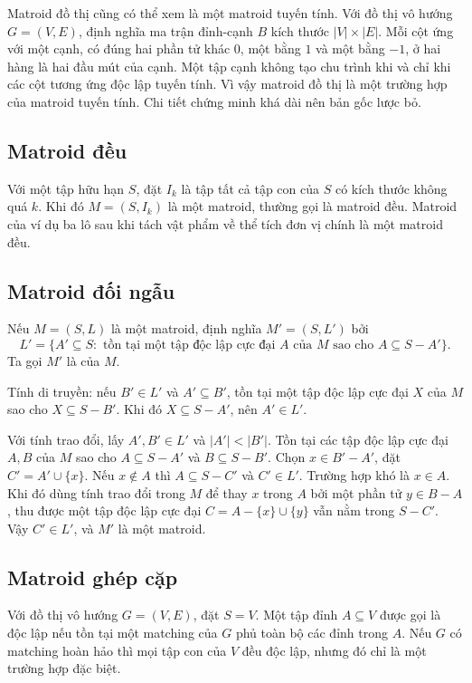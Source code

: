 \documentclass[11pt]{article}
\begin{document}
Matroid đồ thị cũng có thể xem là một matroid tuyến tính. Với đồ thị vô hướng
\(G=(V,E)\), định nghĩa ma trận đỉnh-cạnh \(B\) kích thước \(|V|\times |E|\).
Mỗi cột ứng với một cạnh, có đúng hai phần tử khác \(0\), một bằng \(1\) và
một bằng \(-1\), ở hai hàng là hai đầu mút của cạnh. Một tập cạnh không tạo
chu trình khi và chỉ khi các cột tương ứng độc lập tuyến tính. Vì vậy matroid
đồ thị là một trường hợp của matroid tuyến tính. Chi tiết chứng minh khá dài
nên bản gốc lược bỏ.

\subsection*{Matroid đều}

Với một tập hữu hạn \(S\), đặt \(I_k\) là tập tất cả tập con của \(S\) có kích
thước không quá \(k\). Khi đó \(M=(S,I_k)\) là một matroid, thường gọi là
matroid đều. Matroid của ví dụ ba lô sau khi tách vật phẩm về thể tích đơn vị
chính là một matroid đều.

\subsection*{Matroid đối ngẫu}

Nếu \(M=(S,L)\) là một matroid, định nghĩa \(M'=(S,L')\) bởi
\[
  L'=\{A'\subseteq S:\text{ tồn tại một tập độc lập cực đại } A
      \text{ của } M \text{ sao cho } A\subseteq S-A'\}.
\]
Ta gọi \(M'\) là  của \(M\).

Tính di truyền: nếu \(B'\in L'\) và \(A'\subseteq B'\), tồn tại một tập độc lập
cực đại \(X\) của \(M\) sao cho \(X\subseteq S-B'\). Khi đó
\(X\subseteq S-A'\), nên \(A'\in L'\).

Với tính trao đổi, lấy \(A',B'\in L'\) và \(|A'|<|B'|\). Tồn tại các tập độc
lập cực đại \(A,B\) của \(M\) sao cho \(A\subseteq S-A'\) và
\(B\subseteq S-B'\). Chọn \(x\in B'-A'\), đặt \(C'=A'\cup\{x\}\). Nếu
\(x\notin A\) thì \(A\subseteq S-C'\) và \(C'\in L'\). Trường hợp khó là
\(x\in A\). Khi đó dùng tính trao đổi trong \(M\) để thay \(x\) trong \(A\) bởi
một phần tử \(y\in B-A\), thu được một tập độc lập cực đại
\(C=A-\{x\}\cup\{y\}\) vẫn nằm trong \(S-C'\). Vậy \(C'\in L'\), và \(M'\) là
một matroid.

\subsection*{Matroid ghép cặp}

Với đồ thị vô hướng \(G=(V,E)\), đặt \(S=V\). Một tập đỉnh \(A\subseteq V\)
được gọi là độc lập nếu tồn tại một matching của \(G\) phủ toàn bộ các đỉnh
trong \(A\). Nếu \(G\) có matching hoàn hảo thì mọi tập con của \(V\) đều độc
lập, nhưng đó chỉ là một trường hợp đặc biệt.
\end{document}
